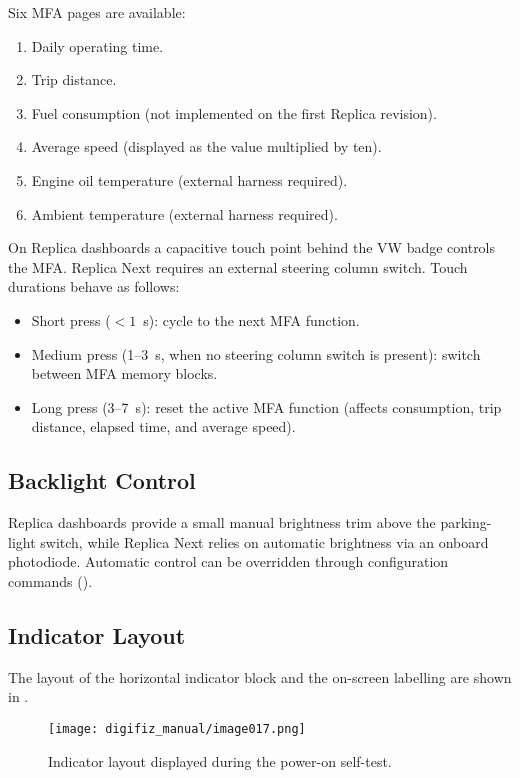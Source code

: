 Six MFA pages are available:
\begin{enumerate}
    \item Daily operating time.
    \item Trip distance.
    \item Fuel consumption (not implemented on the first Replica revision).
    \item Average speed (displayed as the value multiplied by ten).
    \item Engine oil temperature (external harness required).
    \item Ambient temperature (external harness required).
\end{enumerate}

On Replica dashboards a capacitive touch point behind the VW badge controls the MFA.
Replica Next requires an external steering column switch.
Touch durations behave as follows:
\begin{itemize}
    \item Short press (\(<1\)~s): cycle to the next MFA function.
    \item Medium press (1--3~s, when no steering column switch is present): switch between MFA memory blocks.
    \item Long press (3--7~s): reset the active MFA function (affects consumption, trip distance, elapsed time, and average speed).
\end{itemize}

\subsection{Backlight Control}

Replica dashboards provide a small manual brightness trim above the parking-light switch, while Replica Next relies on automatic brightness via an onboard photodiode.
Automatic control can be overridden through configuration commands ().

\subsection{Indicator Layout}

The layout of the horizontal indicator block and the on-screen labelling are shown in .

\begin{figure}[htbp]
    \centering
    \texttt{[image: digifiz\_manual/image017.png]}
    \caption{Indicator layout displayed during the power-on self-test.}
    \label{fig:indicator-layout}
\end{figure}

